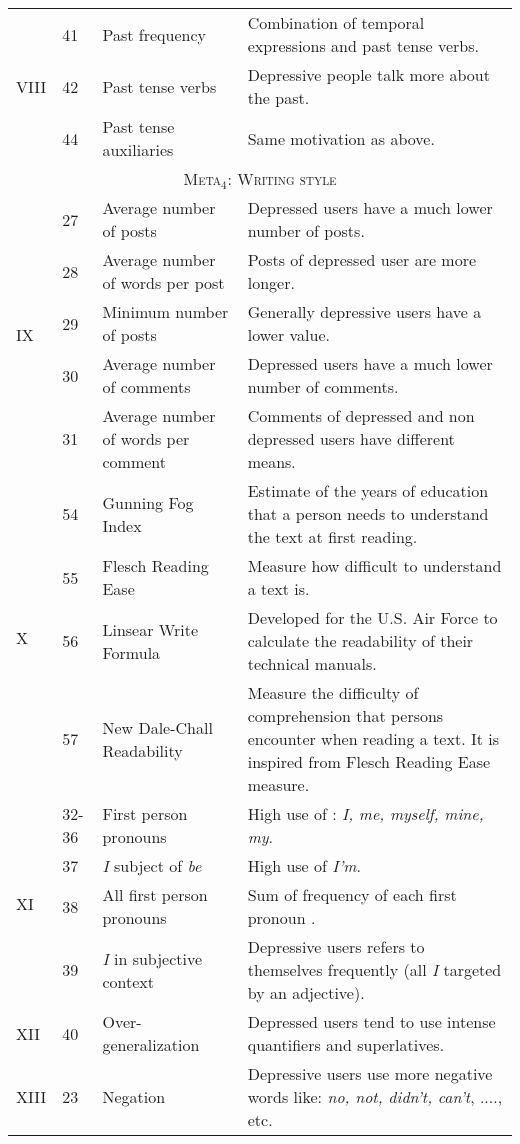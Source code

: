 \begin{center}
\begin{longtable}{@{} l@{\hspace{.2em}} l@{\hspace{.2em}} p{3.3cm} @{\hspace{.2em}} @{\hspace{.2em}} p{6cm}}
\hline
\multirow{3}{*}{VIII}
& 41 & Past frequency & Combination of temporal expressions and past tense verbs.\\
& 42 & Past tense verbs & Depressive people talk more about the past.\\
& 44 & Past tense auxiliaries & Same motivation as above.\\[3pt]
\hline
\multicolumn{4}{c}{\scshape{Meta$_{4}$}: Writing style}\\
\hline
\multirow{5}{*}{IX} 
& 27 & Average number of posts & Depressed users have a much lower number of posts.\\
& 28 & Average number of words per post & Posts of depressed user are more longer.\\
& 29 & Minimum number of posts & Generally depressive users have a lower value.\\
& 30 & Average number of comments & Depressed users have a much lower number of comments.\\
& 31 & Average number of words per comment & Comments of depressed and non depressed users have different means.\\[3pt]
\hline
\multirow{4}{*}{X}
& 54 & Gunning Fog Index & Estimate of the years of education that a person needs to understand the text at first reading.\\ 
& 55 & Flesch Reading Ease & Measure how difficult to understand a text is.\\
& 56 & Linsear Write Formula & Developed for the U.S. Air Force to calculate the readability of their technical manuals.\\
& 57 & New Dale-Chall Readability & Measure the difficulty of comprehension that persons encounter when reading a text. It is inspired from Flesch Reading Ease measure.\\[3pt]
\hline
\multirow{4}{*}{XI} 
& 32-36 & First person pronouns & High use of : \textit{I, me, myself, mine, my}.\\
& 37 &\textit{I} subject of \textit{be} & High use of \textit{I'm}.\\
& 38 & All first person pronouns & Sum of frequency of each first pronoun .\\
& 39 & \textit{I} in subjective context & Depressive users refers to themselves frequently (all \textit{I} targeted by an adjective).\\[3pt]
\hline
XII & 40 & Over-generalization  & Depressed users tend to use intense quantifiers and {superlatives}.\\[3pt]
\hline
XIII & 23 & Negation & Depressive users use more negative words like: \textit{no, not, didn’t, can't}, ...., etc. \\[3pt]

\end{longtable}
\end{center}
